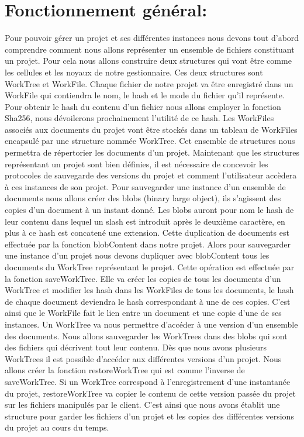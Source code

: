 \documentclass[12pt,francais]{article}
\begin{document}
\section{Fonctionnement général:}
	Pour pouvoir gérer un projet et ses différentes instances nous devons tout d’abord comprendre comment nous allons représenter un ensemble de fichiers constituant un projet. Pour cela nous allons construire deux structures qui vont être comme les cellules et les noyaux de notre gestionnaire. Ces deux structures sont WorkTree et WorkFile. \newline
	Chaque fichier de notre projet va être enregistré dans un WorkFile qui contiendra le nom, le hash et le mode du fichier qu’il représente. Pour obtenir le hash du contenu d’un fichier nous allons employer la fonction Sha256, nous dévoilerons prochainement l’utilité de ce hash. Les WorkFiles associés aux documents du projet vont être stockés dans un tableau de WorkFiles encapsulé par une structure nommée WorkTree. Cet ensemble de structures nous permettra de répertorier les documents d’un projet.
	 Maintenant que les structures représentant un projet sont bien définies, il est nécessaire de concevoir les protocoles de sauvegarde des versions du projet et comment l’utilisateur accèdera à ces instances de son projet.
	Pour sauvegarder une instance d’un ensemble de documents nous allons créer des blobs (binary large object), ils s’agissent des copies d’un document à un instant donné. Les blobs auront pour nom le hash de leur contenu dans lequel un slash est introduit après le deuxième caractère, en plus à ce hash est concatené une extension. Cette duplication de documents est effectuée par la fonction blobContent dans notre projet. \newline
	Alors pour sauvegarder une instance d’un projet nous devons  dupliquer avec blobContent tous les documents du WorkTree  représentant le projet. Cette opération est effectuée par la fonction saveWorkTree. Elle va créer les copies de tous les documents d’un WorkTree et modifier les hash dans les WorkFiles de tous les documents, le hash de chaque document deviendra le hash correspondant à une de ces copies. C’est ainsi que le WorkFile fait le lien entre un document et une copie d’une de ses instances. Un WorkTree va nous permettre d’accéder à une version d’un ensemble des documents. Nous allons sauvegarder les WorkTrees dans des blobs qui sont des fichiers qui décrivent tout leur contenu. \newline
	Dès que nous avons plusieurs WorkTrees il est possible d’accéder aux différentes versions d’un projet.  Nous allons créer la fonction restoreWorkTree qui  est comme l’inverse de saveWorkTree. Si un WorkTree correspond à l’enregistrement d’une instantanée du projet,  restoreWorkTree va copier le contenu de cette version passée du projet sur les fichiers manipulés par le client. C’est ainsi que nous avons établit une structure pour garder les fichiers d’un projet et les copies des différentes versions du projet au cours du temps. \newline \newline
\end{document}
